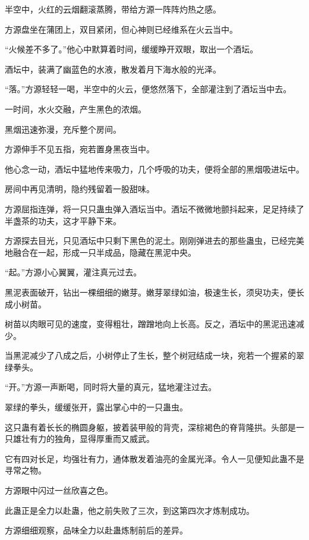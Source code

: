 
\begin{this_body}



半空中，火红的云烟翻滚蒸腾，带给方源一阵阵灼热之感。

方源盘坐在蒲团上，双目紧闭，但心神则已经维系在火云当中。

“火候差不多了。”他心中默算着时间，缓缓睁开双眼，取出一个酒坛。

酒坛中，装满了幽蓝色的水液，散发着月下海水般的光泽。

“落。”方源轻轻一喝，半空中的火云，便悠然落下，全部灌注到了酒坛当中去。

一时间，水火交融，产生黑色的浓烟。

黑烟迅速弥漫，充斥整个房间。

方源伸手不见五指，宛若置身黑夜当中。

他心念一动，酒坛中猛地传来吸力，几个呼吸的功夫，便将全部的黑烟吸进坛中。

房间中再见清明，隐约残留着一股甜味。

方源屈指连弹，将一只只蛊虫弹入酒坛当中。酒坛不微微地颤抖起来，足足持续了半盏茶的功夫，这才平静下来。

方源探去目光，只见酒坛中只剩下黑色的泥土。刚刚弹进去的那些蛊虫，已经完美地融合在一起，形成一只半成品，隐藏在黑泥中央。

“起。”方源小心翼翼，灌注真元过去。

黑泥表面破开，钻出一棵细细的嫩芽。嫩芽翠绿如油，极速生长，须臾功夫，便长成小树苗。

树苗以肉眼可见的速度，变得粗壮，蹭蹭地向上长高。反之，酒坛中的黑泥迅速减少。

当黑泥减少了八成之后，小树停止了生长，整个树冠结成一块，宛若一个握紧的翠绿拳头。

“开。”方源一声断喝，同时将大量的真元，猛地灌注过去。

翠绿的拳头，缓缓张开，露出掌心中的一只蛊虫。

这只蛊有着长长的椭圆身躯，披着装甲般的背壳，深棕褐色的脊背隆拱。头部是一只雄壮有力的独角，显得厚重而又威武。

它有四对长足，均强壮有力，通体散发着油亮的金属光泽。令人一见便知此蛊不是寻常之物。

方源眼中闪过一丝欣喜之色。

此蛊正是全力以赴蛊，他之前失败了三次，到这第四次才炼制成功。

方源细细观察，品味全力以赴蛊炼制前后的差异。


\end{this_body}
